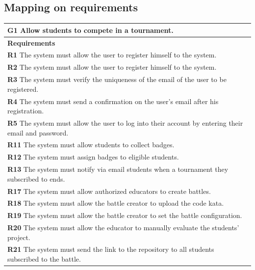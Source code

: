 \subsection{Mapping on requirements}
\begin{table}[H]
    \begin{tabularx}{\textwidth}{X}
        \toprule
        \textbf{G1} Allow students to compete in a tournament.                                                       \\ \midrule
        \textbf{Requirements}                                                                                                        \\ \midrule
        \textbf{R1} The system must allow the user to register himself to the system.                                                    \\
        \textbf{R2} The system must allow the user to register himself to the system.                                         \\ 
        \textbf{R3} The system must verify the uniqueness of the email of the user to be registered.                                        \\ 
        \textbf{R4} The system must send a confirmation on the user's email after his registration.                         \\ 
        \textbf{R5} The system must allow the user to log into their account by entering their email and password.           \\ 
        \textbf{R11} The system must allow students to collect badges.        \\ 
        \textbf{R12} The system must assign badges to eligible students.          \\
        \textbf{R13} The system must notify via email students when a tournament they subscribed to ends. \\ 
        \textbf{R17} The system must allow authorized educators to create battles.        \\ 
        \textbf{R18} The system must allow the battle creator to upload the code kata.       \\ 
        \textbf{R19} The system must allow the battle creator to set the battle configuration.                \\ 
        \textbf{R20} The system must allow the educator to manually evaluate the students' project.          \\    
        \textbf{R21} The system must send the link to the repository to all students subscribed to the battle.            \\ 

\end{tabularx}
\end{table}
